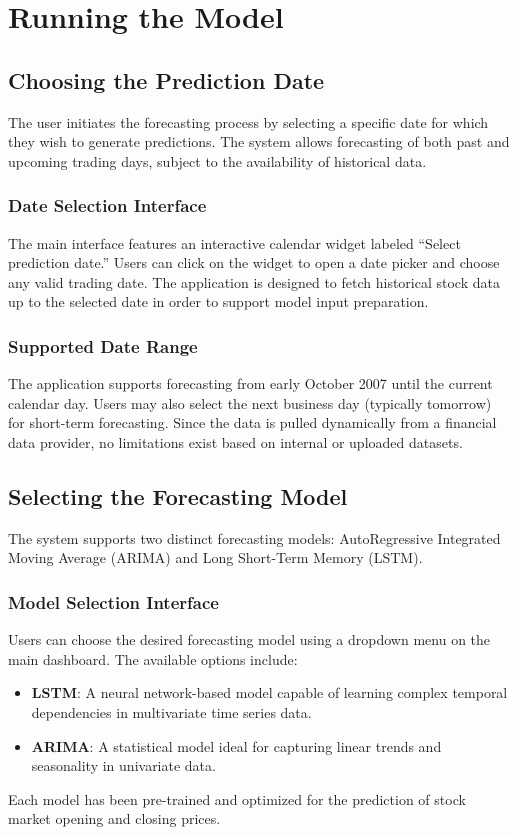 %
%

\chapter{Running the Model}

\section{Choosing the Prediction Date}
The user initiates the forecasting process by selecting a specific date for which they wish to generate predictions. The system allows forecasting of both past and upcoming trading days, subject to the availability of historical data.

\subsection{Date Selection Interface}
The main interface features an interactive calendar widget labeled ``Select prediction date.'' Users can click on the widget to open a date picker and choose any valid trading date. The application is designed to fetch historical stock data up to the selected date in order to support model input preparation.

\subsection{Supported Date Range}
The application supports forecasting from early October 2007 until the current calendar day. Users may also select the next business day (typically tomorrow) for short-term forecasting. Since the data is pulled dynamically from a financial data provider, no limitations exist based on internal or uploaded datasets.

\section{Selecting the Forecasting Model}
The system supports two distinct forecasting models: AutoRegressive Integrated Moving Average (ARIMA) and Long Short-Term Memory (LSTM).

\subsection{Model Selection Interface}
Users can choose the desired forecasting model using a dropdown menu on the main dashboard. The available options include:
\begin{itemize}
	\item \textbf{LSTM}: A neural network-based model capable of learning complex temporal dependencies in multivariate time series data.
	\item \textbf{ARIMA}: A statistical model ideal for capturing linear trends and seasonality in univariate data.
\end{itemize}
Each model has been pre-trained and optimized for the prediction of stock market opening and closing prices.

